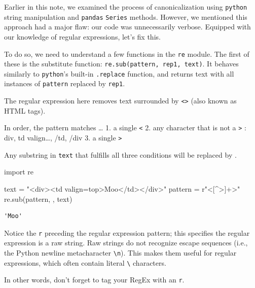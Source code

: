 \documentclass[
  letterpaper,
  DIV=11,
  numbers=noendperiod]{scrreprt}
\newenvironment{Shaded}{\begin{snugshade}}{\end{snugshade}}
\newcommand{\ImportTok}[1]{\textcolor[rgb]{0.00,0.46,0.62}{#1}}
\newcommand{\NormalTok}[1]{\textcolor[rgb]{0.00,0.23,0.31}{#1}}
\newcommand{\OperatorTok}[1]{\textcolor[rgb]{0.37,0.37,0.37}{#1}}
\newcommand{\StringTok}[1]{\textcolor[rgb]{0.13,0.47,0.30}{#1}}
\newcommand{\VerbatimStringTok}[1]{\textcolor[rgb]{0.13,0.47,0.30}{#1}}
\begin{document}
Earlier in this note, we examined the process of canonicalization using
\texttt{python} string manipulation and \texttt{pandas} \texttt{Series}
methods. However, we mentioned this approach had a major flaw: our code
was unnecessarily verbose. Equipped with our knowledge of regular
expressions, let's fix this.

To do so, we need to understand a few functions in the \texttt{re}
module. The first of these is the substitute function:
\texttt{re.sub(pattern,\ rep1,\ text)}. It behaves similarly to
\texttt{python}'s built-in \texttt{.replace} function, and returns text
with all instances of \texttt{pattern} replaced by \texttt{rep1}.

The regular expression here removes text surrounded by
\texttt{\textless{}\textgreater{}} (also known as HTML tags).

In order, the pattern matches \ldots{} 1. a single \texttt{\textless{}}
2. any character that is not a \texttt{\textgreater{}} : div, td
valign\ldots, /td, /div 3. a single \texttt{\textgreater{}}

Any substring in \texttt{text} that fulfills all three conditions will
be replaced by \texttt{\textquotesingle{}\textquotesingle{}}.

\begin{Shaded}
\begin{Highlighting}[]
\ImportTok{import}\NormalTok{ re}

\NormalTok{text }\OperatorTok{=} \StringTok{"\textless{}div\textgreater{}\textless{}td valign=\textquotesingle{}top\textquotesingle{}\textgreater{}Moo\textless{}/td\textgreater{}\textless{}/div\textgreater{}"}
\NormalTok{pattern }\OperatorTok{=} \VerbatimStringTok{r"\textless{}[\^{}\textgreater{}]+\textgreater{}"}
\NormalTok{re.sub(pattern, }\StringTok{\textquotesingle{}\textquotesingle{}}\NormalTok{, text) }
\end{Highlighting}
\end{Shaded}

\begin{verbatim}
'Moo'
\end{verbatim}

Notice the \texttt{r} preceding the regular expression pattern; this
specifies the regular expression is a raw string. Raw strings do not
recognize escape sequences (i.e., the Python newline metacharacter
\texttt{\textbackslash{}n}). This makes them useful for regular
expressions, which often contain literal \texttt{\textbackslash{}}
characters.

In other words, don't forget to tag your RegEx with an \texttt{r}.
\end{document}
